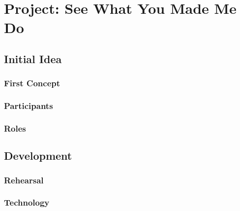 
\chapter{Project: See What You Made Me Do} %

\label{Chapter4} %

\section{Initial Idea}

\subsection{First Concept}

\subsection{Participants}

\subsection{Roles}

\section{Development}

\subsection{Rehearsal}

\subsection{Technology}

